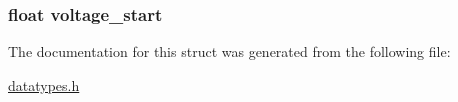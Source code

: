\subsubsection[{voltage\+\_\+start}]{\setlength{\rightskip}{0pt plus 5cm}float voltage\+\_\+start}\label{structadc__config_abc0cfadc3208aed2809d929b7949ce75}


The documentation for this struct was generated from the following file\+:\begin{DoxyCompactItemize}
\item 
\hyperlink{datatypes_8h}{datatypes.\+h}\end{DoxyCompactItemize}
